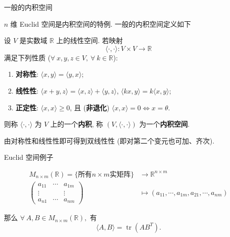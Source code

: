 
\begin{frame}{一般的内积空间}

$n$ 维 Euclid 空间是内积空间的特例. 一般的内积空间定义如下

\begin{Def}[内积空间]
设 $V$ 是实数域 $\mathbb{R}$ 上的线性空间. 若映射
\[
\langle \cdot, \cdot \rangle : V \times V \longrightarrow \mathbb{R}
\]
满足下列性质 ($\forall~x, y, z \in V, ~ \forall~k \in \mathbb{R}$):
\begin{enumerate}
\item \textbf{对称性}: $\langle x, y \rangle = \langle y, x \rangle$;
\pause
\item \textbf{线性性}: $\langle x + y, z \rangle = \langle x, z \rangle + \langle y, z \rangle$, \quad $\langle kx, y \rangle = k\langle x, y \rangle$;
\pause
\item \textbf{正定性}: $\langle x, x \rangle \geqslant 0$, 且 (\textbf{非退化}) $\langle x, x \rangle = 0 \iff x = \theta$.
\end{enumerate}
\pause
则称 $\langle \cdot, \cdot \rangle$ 为 $V$ 上的一个\textbf{内积}, 称 $(V, \langle \cdot, \cdot \rangle)$ 为一个\textbf{内积空间}.
\end{Def}

\vspace{0.5em}
\pause

\begin{remark}
由对称性和线性性即可得到双线性性 (即对第二个变元也可加、齐次).
\end{remark}

\end{frame}


\begin{frame}{Euclid 空间例子}

\begin{align*}
M_{n\times m}(\mathbb{R}) = \{ \text{所有} n\times m \text{实矩阵} \} & \rightarrow \mathbb{R}^{n\times m} \\
\begin{pmatrix}
a_{11} & \cdots & a_{1m} \\
\vdots & & \vdots \\
a_{n1} & \cdots & a_{nm}
\end{pmatrix} & \mapsto (a_{11}, \cdots, a_{1m}, a_{21}, \cdots, a_{nm})
\end{align*}

\pause

那么 $\forall~A, B \in M_{n\times m}(\mathbb{R}),$ 有
\[\langle A, B \rangle = \operatorname{tr} (AB^T).\]

\end{frame}

